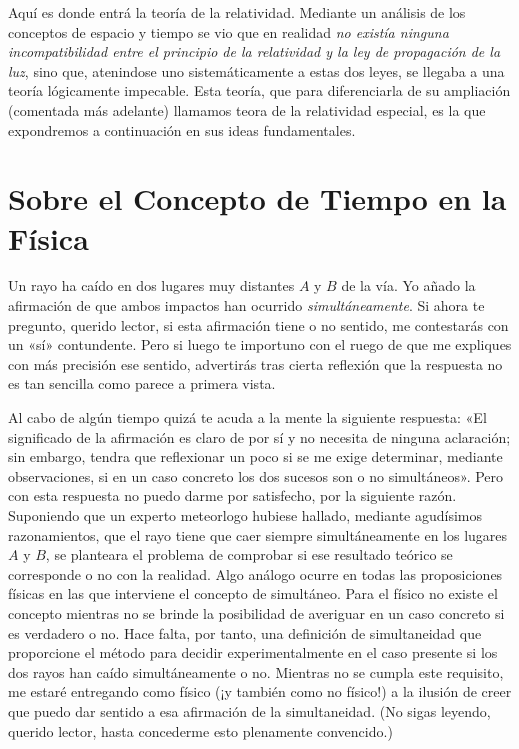 \documentclass[spanish]{book}
\begin{document}
Aquí es donde entrá la teoría de la relatividad. Mediante un análisis de los
conceptos de espacio y tiempo se vio que en realidad \textit{no existía ninguna 
incompatibilidad entre el principio de la relatividad y la ley de propagación de la luz}, sino que,
atenindose uno sistemáticamente a estas dos leyes, se llegaba a una teoría lógicamente
impecable. Esta teoría, que para diferenciarla de su ampliación (comentada más
adelante) llamamos teora de la relatividad especial, es la que expondremos a
continuación en sus ideas fundamentales.

\chapter{Sobre el Concepto de Tiempo en la Física}

Un rayo ha caído en dos lugares muy distantes $A$ y $B$ de la vía. Yo añado la
afirmación de que ambos impactos han ocurrido \textit{simultáneamente}. Si ahora te
pregunto, querido lector, si esta afirmación tiene o no sentido, me contestarás con un
«sí» contundente. Pero si luego te importuno con el ruego de que me expliques con
más precisión ese sentido, advertirás tras cierta reflexión que la respuesta no es
tan sencilla como parece a primera vista.

Al cabo de algún tiempo quizá te acuda a la mente la siguiente respuesta: «El
significado de la afirmación es claro de por sí y no necesita de ninguna aclaración; sin
embargo, tendra que reflexionar un poco si se me exige determinar, mediante
observaciones, si en un caso concreto los dos sucesos son o no simultáneos». Pero
con esta respuesta no puedo darme por satisfecho, por la siguiente razón.
Suponiendo que un experto meteorlogo hubiese hallado, mediante agudísimos
razonamientos, que el rayo tiene que caer siempre simultáneamente en los lugares $A$ y
$B$, se planteara el problema de comprobar si ese resultado teórico se corresponde o
no con la realidad. Algo análogo ocurre en todas las proposiciones físicas en las que
interviene el concepto de simultáneo. Para el físico no existe el concepto mientras
no se brinde la posibilidad de averiguar en un caso concreto si es verdadero o no.
Hace falta, por tanto, una definición de simultaneidad que proporcione el método
para decidir experimentalmente en el caso presente si los dos rayos han
caído simultáneamente o no. Mientras no se cumpla este requisito, me estaré 
entregando como físico (¡y también como no físico!) a la ilusión de creer que
puedo dar sentido a esa afirmación de la simultaneidad. (No sigas leyendo,
querido lector, hasta concederme esto plenamente convencido.)
\end{document}
